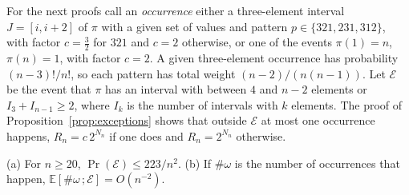 \noindent For the next proofs call an \emph{occurrence} either a three-element interval $J=[i,i+2]$ of $\pi$ with a given set of values and pattern $p\in\{321,231,312\}$, with factor $c=\tfrac32$ for $321$ and $c=2$ otherwise, or one of the events $\pi(1)=n$, $\pi(n)=1$, with factor $c=2$. A given three-element occurrence has probability $(n-3)!/n!$, so each pattern has total weight $(n-2)/(n(n-1))$. Let $\mathcal E$ be the event that $\pi$ has an interval with between $4$ and $n-2$ elements or $I_3+I_{n-1}\ge2$, where $I_k$ is the number of intervals with $k$ elements. The proof of Proposition~\ref{prop:exceptions} shows that outside $\mathcal E$ at most one occurrence happens, $R_n=c\,2^{N_n}$ if one does and $R_n=2^{N_n}$ otherwise.

\begin{lemma}\label{lem:sharpbad}
(a) For $n\ge20$, $\Pr(\mathcal E)\le223/n^2$. (b) If $\#\omega$ is the number of occurrences that happen, $\mathbb E[\#\omega\,;\mathcal E]=O(n^{-2})$. 
\end{lemma}

